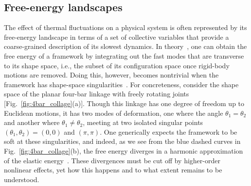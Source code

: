\subsection{Free-energy landscapes}

The effect of thermal fluctuations on a physical system is often represented by its free-energy landscape in terms of a set of collective variables that provide a coarse-grained description of its slowest dynamics.
In theory~\cite{go1976,echenique2011}, one can obtain the free energy of a framework by integrating out the fast modes that are transverse to its shape space, i.e., the subset of its configuration space once rigid-body motions are removed.
Doing this, however, becomes nontrivial when the framework has shape-space singularities~\cite{zlatanov2002,liu2003,donelan2007}.
For concreteness, consider the shape space of the planar four-bar linkage with freely rotating joints~\cite{grashof1883,hartenberg1964,shimamoto2005} [Fig.~\ref{fig:4bar_collage}(a)].
Though this linkage has one degree of freedom up to Euclidean motions, it has two modes of deformation, one where the angle $\theta_1 = \theta_2$ and another where $\theta_1 \ne \theta_2$, meeting at two isolated singular points $(\theta_1,\theta_2) = (0,0)$ and $(\pi,\pi)$.
One generically expects the framework to be soft at these singularities, and indeed, as we see from the blue dashed curves in Fig.~\ref{fig:4bar_collage}(b), the free energy diverges in a harmonic approximation of the elastic energy~\cite{rocklin2018}.
These divergences must be cut off by higher-order nonlinear effects, yet how this happens and to what extent remains to be understood.

